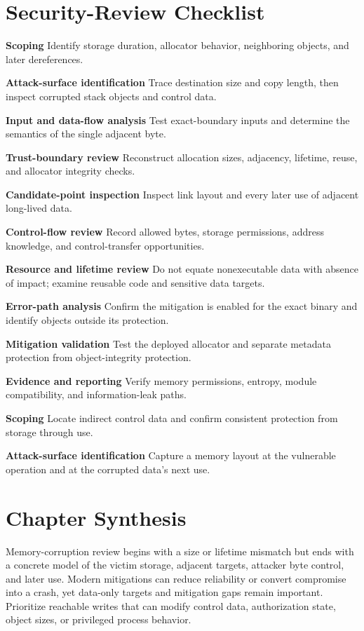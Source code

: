 \documentclass[11pt,letterpaper]{article}
\begin{document}
\section{Security-Review Checklist}
\begin{CornellChecklist}
\item \textbf{Scoping}
Identify storage duration, allocator behavior, neighboring objects, and later dereferences.
\item \textbf{Attack-surface identification}
Trace destination size and copy length, then inspect corrupted stack objects and control data.
\item \textbf{Input and data-flow analysis}
Test exact-boundary inputs and determine the semantics of the single adjacent byte.
\item \textbf{Trust-boundary review}
Reconstruct allocation sizes, adjacency, lifetime, reuse, and allocator integrity checks.
\item \textbf{Candidate-point inspection}
Inspect link layout and every later use of adjacent long-lived data.
\item \textbf{Control-flow review}
Record allowed bytes, storage permissions, address knowledge, and control-transfer opportunities.
\item \textbf{Resource and lifetime review}
Do not equate nonexecutable data with absence of impact; examine reusable code and sensitive data targets.
\item \textbf{Error-path analysis}
Confirm the mitigation is enabled for the exact binary and identify objects outside its protection.
\item \textbf{Mitigation validation}
Test the deployed allocator and separate metadata protection from object-integrity protection.
\item \textbf{Evidence and reporting}
Verify memory permissions, entropy, module compatibility, and information-leak paths.
\item \textbf{Scoping}
Locate indirect control data and confirm consistent protection from storage through use.
\item \textbf{Attack-surface identification}
Capture a memory layout at the vulnerable operation and at the corrupted data's next use.
\end{CornellChecklist}
\section{Chapter Synthesis}
Memory-corruption review begins with a size or lifetime mismatch but ends with a concrete model of the victim storage, adjacent targets, attacker byte control, and later use. Modern mitigations can reduce reliability or convert compromise into a crash, yet data-only targets and mitigation gaps remain important. Prioritize reachable writes that can modify control data, authorization state, object sizes, or privileged process behavior.
\end{document}
